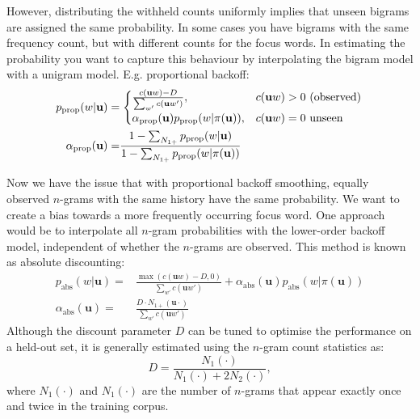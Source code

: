 However, distributing the withheld counts uniformly implies that unseen bigrams are assigned the same probability.
In some cases you have bigrams with the same frequency count, but with different counts for the focus words. In estimating the probability you want to capture this behaviour by interpolating the bigram model with a unigram model. E.g. proportional backoff:~
\begin{equation}\begin{split}
	p_{\operatorname{prop}}(w|\mathbf{u})=&\left.
    \begin{cases}
    	\frac{c(\mathbf{u}w)-D}{\sum_{w'}c(\mathbf{u}w')}, & c(\mathbf{u}w) > 0\textnormal{ (observed)} \\
        \alpha_{\operatorname{prop}}(\mathbf{u})p_{\operatorname{prop}}(w|\pi(\mathbf{u})), & c(\mathbf{u}w) = 0\textnormal{ unseen}
    \end{cases}\right. \\
    \alpha_{\operatorname{prop}}(\mathbf{u}) =& \frac{1 - \sum_{N_{1+}}p_{\operatorname{prop}}(w|\mathbf{u})}{1 - \sum_{N_{1+}}p_{\operatorname{prop}}(w|\pi(\mathbf{u}))}
\end{split}\end{equation}

Now we have the issue that with proportional backoff smoothing, equally observed $n$-grams with the same history have the same probability. We want to create a bias towards a more frequently occurring focus word. One approach would be to interpolate all $n$-gram probabilities with the lower-order backoff model, independent of whether the $n$-grams are observed. This method is known as absolute discounting\autocite{ney1994structuring}:
\begin{equation}\begin{split}
p_{\operatorname{abs}}(w|\mathbf{u})=&\frac{\max(c(\mathbf{u}w)-D,0)}{\sum_{w'}c(\mathbf{u}w')} + \alpha_{\operatorname{abs}}(\mathbf{u})p_{\operatorname{abs}}(w|\pi(\mathbf{u})) \\
\alpha_{\operatorname{abs}}(\mathbf{u})=&\frac{D\cdot N_{1+}(\mathbf{u}\cdot)}{\sum_{w'}c(\mathbf{u}w')}
\end{split}\end{equation}
Although the discount parameter $D$ can be tuned to optimise the performance on a held-out set, it is generally estimated using the $n$-gram count statistics as:
\begin{equation}
D = \frac{N_{1}(\cdot)}{N_{1}(\cdot)+2N_{2}(\cdot)},
\end{equation}
where $N_{1}(\cdot)$ and $N_{1}(\cdot)$ are the number of $n$-grams that appear exactly once and twice in the training corpus.

